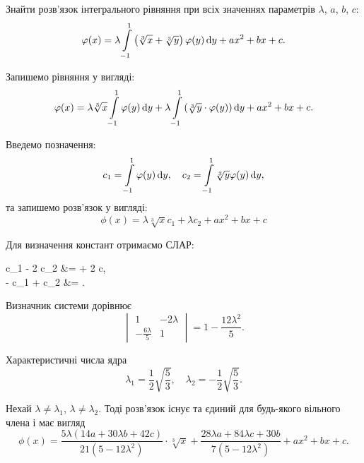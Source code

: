 \begin{example}
	Знайти розв'язок інтегрального рівняння при всіх значеннях параметрів $\lambda$, $a$, $b$, $c$: 
	\begin{equation*}
		\varphi(x) = \lambda \displaystyle\int\limits_{-1}^1 \left(\sqrt[3]{x} + \sqrt[3]{y}\right) \varphi(y) \mathop{}\!\mathrm{d} y + ax^2 + bx + c.
	\end{equation*}
\end{example}

\begin{solution}
	Запишемо рівняння у вигляді: 
	\begin{equation*}
		\varphi(x) = \lambda \sqrt[3]{x} \displaystyle\int\limits_{-1}^1 \varphi(y) \mathop{}\!\mathrm{d} y + \lambda \displaystyle\int\limits_{-1}^1 \left( \sqrt[3]{y} \cdot \varphi(y) \right) \mathop{}\!\mathrm{d} y + ax^2 + bx + c.
	\end{equation*}

	Введемо позначення: 
	\begin{equation*}
		c_1 = \displaystyle\int\limits_{-1}^1 \varphi(y) \mathop{}\!\mathrm{d} y, \quad c_2 = \displaystyle\int\limits_{-1}^1 \sqrt[3]{y} \varphi(y) \mathop{}\!\mathrm{d} y,
	\end{equation*}
	та запишемо розв'язок у вигляді:
	\begin{equation*}
		\phi(x) = \lambda \sqrt[3]{x} c_1 + \lambda c_2 + ax^2 + bx + c
	\end{equation*}

	Для визначення констант отримаємо СЛАР:
	\begin{system*}
		c_1 - 2 \lambda c_2 &=  + 2 c, \\
		-  c_1 + c_2 &= .
	\end{system*}

	Визначник системи дорівнює
	\begin{equation*}
		\begin{vmatrix} 1 & - 2 \lambda \\ - \frac{6\lambda}{5} & 1 \end{vmatrix} = 1 - \frac{12\lambda^2}{5}.
	\end{equation*}

	Характеристичні числа ядра 
	\begin{equation*}
		\lambda_1 = \frac{1}{2} \sqrt{\frac{5}{3}}, \quad \lambda_2 = - \frac{1}{2} \sqrt{\frac{5}{3}}.
	\end{equation*}

	Нехай $\lambda \ne \lambda_1$, $\lambda \ne \lambda_2$. Тоді розв'язок існує та єдиний для будь-якого вільного члена і має вигляд
	\begin{equation*}
		\phi(x) = \dfrac{5 \lambda (14 a + 30 \lambda b + 42 c)}{21 (5 - 12 \lambda^2)} \cdot\sqrt[3]{x} + \dfrac{28 \lambda a + 84 \lambda c + 30 b}{7(5 - 12 \lambda^2)} + ax^2 + bx + c.
	\end{equation*}


\end{solution}
